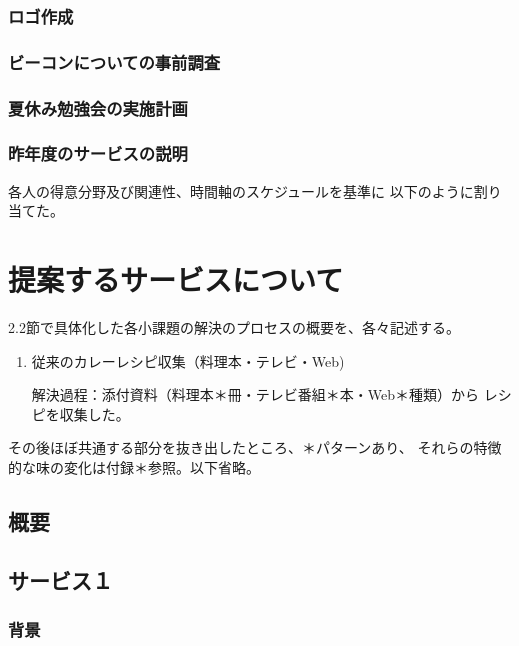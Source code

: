 \documentclass[openany,11pt,papersize]{jsbook}
\begin{document}
\subsection{ロゴ作成}


\subsection{ビーコンについての事前調査}


\subsection{夏休み勉強会の実施計画}


\subsection{昨年度のサービスの説明}



各人の得意分野及び関連性、時間軸のスケジュールを基準に
以下のように割り当てた。


\chapter{提案するサービスについて}
2.2節で具体化した各小課題の解決のプロセスの概要を、各々記述する。

\begin{enumerate}
 \item 従来のカレーレシピ収集（料理本・テレビ・Web) 
\par 解決過程：添付資料（料理本＊冊・テレビ番組＊本・Web＊種類）から
     レシピを収集した。 
\end{enumerate}


その後ほぼ共通する部分を抜き出したところ、＊パターンあり、
それらの特徴的な味の変化は付録＊参照。以下省略。
\section{概要}

\section{サービス１}

\subsection{背景}
\end{document}

